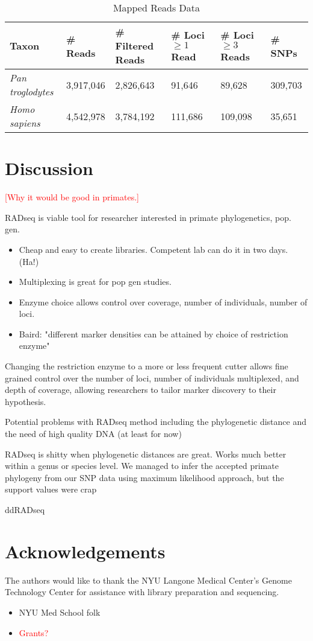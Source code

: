 \documentclass[12pt]{article}
\begin{document}
\begin{table}[h]
\caption{Mapped Reads Data}
\begin{center}
	\small
	\begin{tabular}{ p{3cm} || p{1.75cm} | p{1.75cm} || p{1.75cm} | p{1.75cm} | l }
		\hline
		Taxon                  & \# Reads  & \# Filtered Reads & \# Loci $\ge 1$ Read & \# Loci $\ge 3$ Reads & \# SNPs \\ \hline\hline
		\emph{Pan troglodytes} & 3,917,046 & 2,826,643           &  91,646              &  89,628               & 309,703 \\ \hline
		\emph{Homo sapiens}    & 4,542,978 & 3,784,192           & 111,686              & 109,098               &  35,651 \\ \hline
	\end{tabular}
\end{center}
\end{table}


\section{Discussion}

\textcolor{red}{[Why it would be good in primates.]}

RADseq is viable tool for researcher interested in primate phylogenetics, pop. gen.

\begin{itemize}
	\item Cheap and easy to create libraries. Competent lab can do it in two days. (Ha!)
	\item Multiplexing is great for pop gen studies.
	\item Enzyme choice allows control over coverage, number of individuals, number of loci.
	\item Baird: "different marker densities can be attained by choice of restriction enzyme"
\end{itemize}
	
Changing the restriction enzyme to a more or less frequent cutter allows fine grained control over the number of loci, number of individuals multiplexed, and depth of coverage, allowing researchers to tailor marker discovery to their hypothesis. 

Potential problems with RADseq method including the phylogenetic distance and the need of high quality DNA (at least for now)

RADseq is shitty when phylogenetic distances are great. Works much better within a genus or species level. We managed to infer the accepted primate phylogeny from our SNP data using maximum likelihood approach, but the support values were crap

ddRADseq

\section{Acknowledgements}

The authors would like to thank the NYU Langone Medical Center's Genome Technology Center for assistance with library preparation and sequencing.

\begin{itemize}
	\item NYU Med School folk
	\item \textcolor{red}{Grants?}
\end{itemize}
\end{document}
